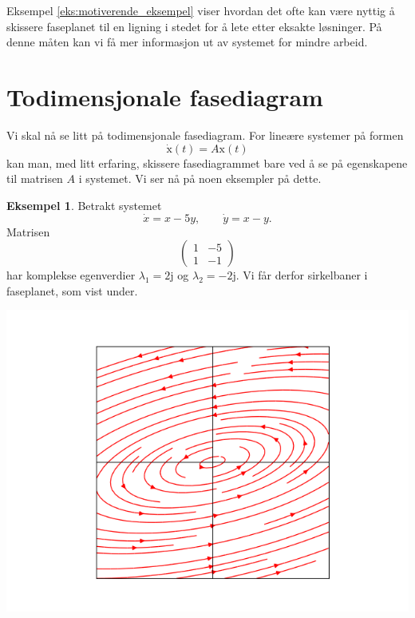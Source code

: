 \documentclass{article}
\theoremstyle{plain}
\theoremstyle{definition}
\newtheorem{eksempel}[teorem]{Eksempel}
\theoremstyle{remark}
\newcommand{\boldvec}[1]{\boldsymbol{\mathrm{#1}}}
\newcommand{\imagunit}{\mathrm{j}}
\begin{document}
Eksempel \ref{eks:motiverende_eksempel} viser hvordan det ofte kan være nyttig å skissere faseplanet til en ligning i stedet for å lete etter eksakte løsninger. På denne måten kan vi få mer informasjon ut av systemet for mindre arbeid.


\section*{Todimensjonale fasediagram}
Vi skal nå se litt på todimensjonale fasediagram. For lineære systemer på formen
\begin{equation*}
    \boldvec{\dot{x}}(t) = A \boldvec{x}(t)
\end{equation*}
kan man, med litt erfaring, skissere fasediagrammet bare ved å se på egenskapene til matrisen $A$ i systemet. Vi ser nå på noen eksempler på dette.

\begin{eksempel}
    Betrakt systemet
    \begin{equation*}
        \dot{x} = x - 5 y, \qquad \dot{y} = x - y.
    \end{equation*}
    Matrisen
    \begin{equation*}
        \begin{pmatrix}
            1 & -5 \\
            1 & -1
        \end{pmatrix}
    \end{equation*}
    har komplekse egenverdier $\lambda_1 = 2 \imagunit$ og $\lambda_2 = -2 \imagunit$. Vi får derfor sirkelbaner i faseplanet, som vist under.
    \begin{center}
        \includegraphics[scale=0.5]{phase_plane_2.png}
    \end{center}
\end{eksempel}
\end{document}
